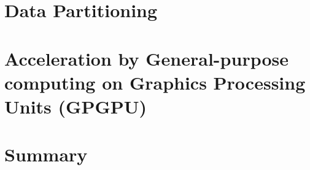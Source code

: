 \section{Data Partitioning}%
%
\section[Acceleration by GPGPU]{Acceleration by General-purpose
computing on Graphics Processing Units (GPGPU)}
%
%
\section{Summary}

